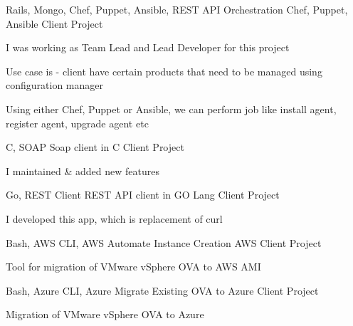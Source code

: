 \begin{cventries}
  \cventry
    {Rails, Mongo, Chef, Puppet, Ansible, REST API} %
    {Orchestration Chef, Puppet, Ansible} %
    {Client Project} %
    {} %
    {
      \begin{cvitems} %
        \item {I was working as Team Lead and Lead Developer for this project}
        \item {Use case is - client have certain products that need to be managed using configuration manager}
        \item {Using either Chef, Puppet or Ansible, we can perform job like install agent, register agent, upgrade agent etc}
      \end{cvitems}
    }

  \cventry
    {C, SOAP} %
    {Soap client in C} %
    {Client Project} %
    {} %
    {
      \begin{cvitems} %
        \item {I maintained \& added new features}
      \end{cvitems}
    }

  \cventry
    {Go, REST Client} %
    {REST API client in GO Lang} %
    {Client Project} %
    {} %
    {
      \begin{cvitems} %
        \item {I developed this app, which is replacement of curl}
      \end{cvitems}
    }
  
  \cventry
    {Bash, AWS CLI, AWS} %
    {Automate Instance Creation AWS} %
    {Client Project} %
    {} %
    {
      \begin{cvitems} %
        \item {Tool for migration of VMware vSphere OVA to AWS AMI}
      \end{cvitems}
    }

  \cventry
    {Bash, Azure CLI, Azure} %
    {Migrate Existing OVA to Azure} %
    {Client Project} %
    {} %
    {
      \begin{cvitems} %
        \item {Migration of VMware vSphere OVA to Azure}
      \end{cvitems}
    }


\end{cventries}

